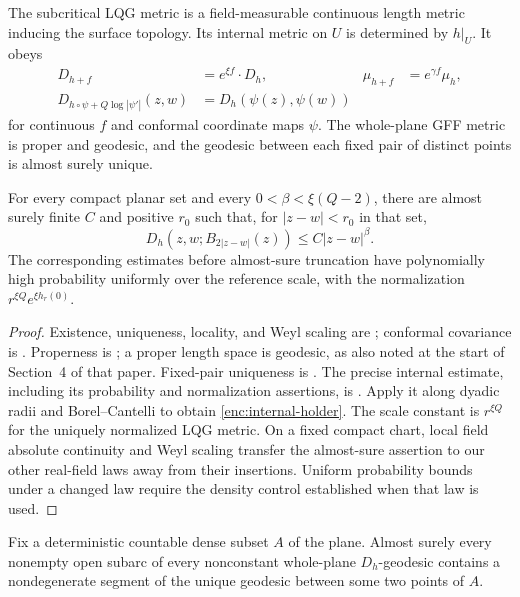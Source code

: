 \begin{theorem}\label{enc:lqg-metric}
The subcritical LQG metric is a field-measurable continuous length metric
inducing the surface topology.  Its internal metric on $U$ is determined
by $h|_U$.  It obeys
\begin{align}
 D_{h+f}&=e^{\xi f}\!\cdot D_h,
 &\mu_{h+f}&=e^{\gamma f}\mu_h,\label{enc:weyl}\\
 D_{h\circ\psi+Q\log|\psi'|}(z,w)
 &=D_h(\psi(z),\psi(w))\label{enc:covariance}
\end{align}
for continuous $f$ and conformal coordinate maps $\psi$.
The whole-plane GFF metric is proper and geodesic, and the geodesic
between each fixed pair of distinct points is almost surely unique.

For every compact planar set and every
$0<\beta<\xi(Q-2)$, there are almost surely finite $C$ and positive
$r_0$ such that, for $|z-w|<r_0$ in that set,
\begin{equation}\label{enc:internal-holder}
 D_h(z,w;B_{2|z-w|}(z))\le C|z-w|^\beta.
\end{equation}
The corresponding estimates before almost-sure truncation have
polynomially high probability uniformly over the reference scale, with
the normalization $r^{\xi Q}e^{\xi h_r(0)}$.
\end{theorem}

\begin{proof}
Existence, uniqueness, locality, and Weyl scaling are
\cite{GwynneMillerMetric}; conformal covariance is
\cite[Theorem 1.3]{GwynneMillerCovariance}.  Properness is \cite[Lemma~3.8]{DubedatEtAlWeakMetric}; a proper
length space is geodesic, as also noted at the start of Section~4
of that paper.
Fixed-pair uniqueness is \cite[Theorem 1.2]{MillerQianGeodesics}.
The precise internal estimate, including its probability and
normalization assertions, is
\cite[Lemma 3.20, equations (3.66)--(3.67)]{DubedatEtAlWeakMetric}.
Apply it along dyadic radii and Borel--Cantelli to obtain
\eqref{enc:internal-holder}.  The scale constant is
$r^{\xi Q}$ for the uniquely normalized LQG metric.  On a fixed compact
chart, local field absolute continuity and Weyl scaling transfer the
almost-sure assertion to our other real-field laws away from their
insertions.  Uniform probability bounds under a changed law require
the density control established when that law is used.
\end{proof}

\begin{lemma}\label{enc:geodesic-anchors}
Fix a deterministic countable dense subset $A$ of the plane.  Almost
surely every nonempty open subarc of every nonconstant whole-plane
$D_h$-geodesic contains a nondegenerate segment of the unique geodesic
between some two points of $A$.
\end{lemma}

